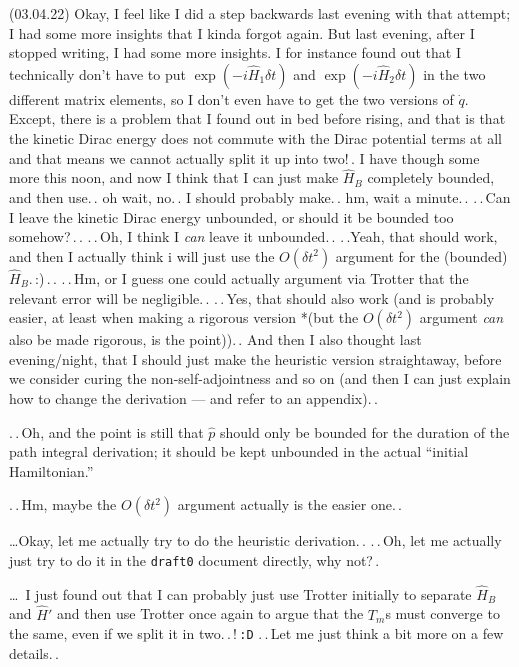 \documentclass{report}
\begin{document}
(03.04.22) Okay, I feel like I did a step backwards last evening with that attempt; I had some more insights that I kinda forgot again. But last evening, after I stopped writing, I had some more insights. I for instance found out that I technically don't have to put $\exp(-i\hat H_1 \delta t)$ and $\exp(-i\hat H_2 \delta t)$ in the two different matrix elements, so I don't even have to get the two versions of $\dot q$. Except, there is a problem that I found out in bed before rising, and that is that the kinetic Dirac energy does not commute with the Dirac potential terms at all and that means we cannot actually split it up into two!\,. I have though some more this noon, and now I think that I can just make $\hat H_B$ completely bounded, and then use.\,. oh wait, no.\,. I should probably make.\,. hm, wait a minute.\,. .\,.\,Can I leave the kinetic Dirac energy unbounded, or should it be bounded too somehow?\,.\,. .\,.\,Oh, I think I \emph{can} leave it unbounded.\,. .\,.Yeah, that should work, and then I actually think i will just use the $O(\delta t^2)$ argument for the (bounded) $\hat H_B$.\,:)\,.\,. .\,.\,Hm, or I guess one could actually argument via Trotter that the relevant error will be negligible.\,. .\,.\,Yes, that should also work (and is probably easier, at least when making a rigorous version *(but the $O(\delta t^2)$ argument \emph{can} also be made rigorous, is the point)).\,. And then I also thought last evening/night, that I should just make the heuristic version straightaway, before we consider curing the non-self-adjointness and so on (and then I can just explain how to change the derivation --- and refer to an appendix).\,. 

.\,.\,Oh, and the point is still that $\hat p$ should only be bounded for the duration of the path integral derivation; it should be kept unbounded in the actual ``initial Hamiltonian.'' 

.\,.\,Hm, maybe the $O(\delta t^2)$ argument actually is the easier one.\,. 


\ldots Okay, let me actually try to do the heuristic derivation.\,. .\,.\,Oh, let me actually just try to do it in the \texttt{draft0} document directly, why not?\,. %

\ldots\ I just found out that I can probably just use Trotter initially to separate $\hat H_B$ and $\hat H'$ and then use Trotter once again to argue that the $T_m$s must converge to the same, even if we split it in two.\,.\,!\,\texttt{:D} .\,.\,Let me just think a bit more on a few details.\,. %
\end{document}
